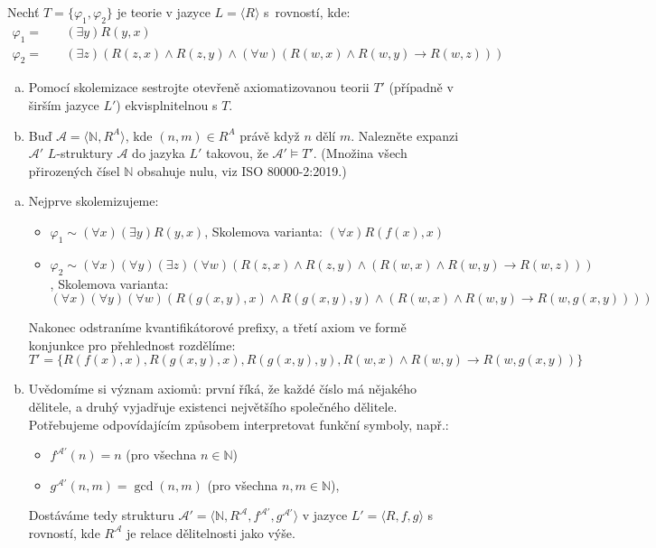 \begin{problem}

    Nechť $T=\{\varphi_1,\varphi_2\}$ je teorie v jazyce $L=\langle R\rangle$ s~rovností, kde:
    \begin{align*}
    \varphi_1=&\quad (\exists y)R(y,x)\\
    \varphi_2=&\quad (\exists z)(R(z,x)\wedge R(z,y)\wedge (\forall w)(R(w,x) \wedge R(w,y)\to R(w,z)))
    \end{align*}
    \begin{enumerate}[(a)]
        \item Pomocí skolemizace sestrojte otevřeně axiomatizovanou teorii $T'$ (případně v širším jazyce $L'$) ekvisplnitelnou s $T$.
        \item Buď $\mathcal{A}=\langle\mathbb{N},R^A\rangle$, kde $(n,m)\in R^A$ právě když $n$ dělí $m$.  Nalezněte expanzi $\mathcal{A}'$ $L$-struktury $\mathcal{A}$ do jazyka $L'$ takovou, že $\mathcal{A}'\models T'$. (Množina všech přirozených čísel $\mathbb N$ obsahuje nulu, viz ISO 80000-2:2019.)
    \end{enumerate}

    \begin{solution}
        \begin{enumerate}[(a)]
            \item Nejprve skolemizujeme:
            \begin{itemize}
                \item $\varphi_1\sim (\forall x)(\exists y)R(y,x)$, Skolemova varianta: 
                $(\forall x)R(f(x),x)$
                \item $\varphi_2\sim (\forall x)(\forall y)(\exists z)(\forall w)(R(z,x)\wedge R(z,y)\wedge (R(w,x) \wedge R(w,y)\to R(w,z)))$, Skolemova varianta: $(\forall x)(\forall y)(\forall w)(R(g(x,y),x)\wedge R(g(x,y),y)\wedge (R(w,x) \wedge R(w,y)\to R(w,g(x,y))))$
            \end{itemize}
            Nakonec odstraníme kvantifikátorové prefixy, a třetí axiom ve formě konjunkce pro přehlednost rozdělíme:
            $$
            T'=\{R(f(x),x), R(g(x,y),x), R(g(x,y),y), R(w,x) \wedge R(w,y)\to R(w,g(x,y))\}
            $$
            \item Uvědomíme si význam axiomů: první říká, že každé číslo má nějakého dělitele, a druhý vyjadřuje existenci největšího společného dělitele. Potřebujeme odpovídajícím způsobem interpretovat funkční symboly, např.:
            \begin{itemize}
                \item $f^{\mathcal A'}(n)=n$ (pro všechna $n\in\mathbb N$)
                \item $g^{\mathcal A'}(n,m)=\gcd(n,m)$ (pro všechna $n,m\in\mathbb N$),
            \end{itemize}
            Dostáváme tedy strukturu $\mathcal A'=\langle\mathbb N,R^\mathcal A,f^{\mathcal A'},g^{\mathcal A'}\rangle$ v jazyce $L'=\langle R,f,g\rangle$ s rovností, kde $R^\mathcal A$ je relace dělitelnosti jako výše.


\end{enumerate}
\end{solution}
\end{problem}
